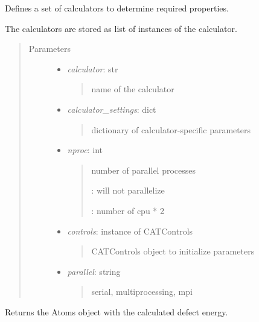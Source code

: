 \documentclass[letterpaper,10pt,english]{sphinxmanual}
\begin{document}
\begin{fulllineitems}
\label{classes:catcalc.CATCalc}
Defines a set of calculators to determine required properties.

The calculators are stored as list of instances of the calculator.
\begin{quote}\begin{description}
\item[{Parameters}] \leavevmode\begin{itemize}
\item {} 
\emph{calculator}: str
\begin{quote}

name of the calculator
\end{quote}

\item {} 
\emph{calculator\_settings}: dict
\begin{quote}

dictionary of calculator-specific parameters
\end{quote}

\item {} 
\emph{nproc}: int
\begin{quote}

number of parallel processes

: will not parallelize

: number of cpu * 2
\end{quote}

\item {} 
\emph{controls}: instance of CATControls
\begin{quote}

CATControls object to initialize parameters
\end{quote}

\item {} 
\emph{parallel}: string
\begin{quote}

serial, multiprocessing, mpi
\end{quote}

\end{itemize}

\end{description}\end{quote}

\begin{fulllineitems}
\label{classes:catcalc.CATCalc.calc_def_ene}
Returns the Atoms object with the calculated defect energy.


\end{fulllineitems}
\end{fulllineitems}
\end{document}
